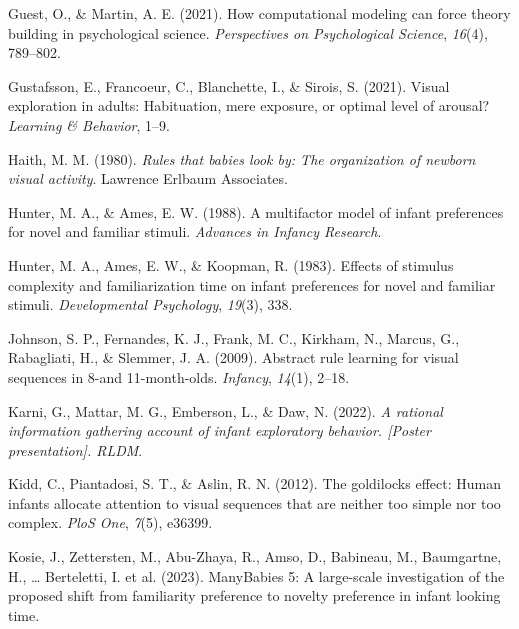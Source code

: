 \documentclass[10pt, letterpaper]{article}
\newenvironment{CSLReferences}%
  {}%
  {\par}
\begin{document}
\begin{CSLReferences}{1}{0}
\leavevmode{}%
Guest, O., \& Martin, A. E. (2021). How computational modeling can force
theory building in psychological science. \emph{Perspectives on
Psychological Science}, \emph{16}(4), 789--802.

\leavevmode{}%
Gustafsson, E., Francoeur, C., Blanchette, I., \& Sirois, S. (2021).
Visual exploration in adults: Habituation, mere exposure, or optimal
level of arousal? \emph{Learning \& Behavior}, 1--9.

\leavevmode{}%
Haith, M. M. (1980). \emph{Rules that babies look by: The organization
of newborn visual activity}. Lawrence Erlbaum Associates.

\leavevmode{}%
Hunter, M. A., \& Ames, E. W. (1988). A multifactor model of infant
preferences for novel and familiar stimuli. \emph{Advances in Infancy
Research}.

\leavevmode{}%
Hunter, M. A., Ames, E. W., \& Koopman, R. (1983). Effects of stimulus
complexity and familiarization time on infant preferences for novel and
familiar stimuli. \emph{Developmental Psychology}, \emph{19}(3), 338.

\leavevmode{}%
Johnson, S. P., Fernandes, K. J., Frank, M. C., Kirkham, N., Marcus, G.,
Rabagliati, H., \& Slemmer, J. A. (2009). Abstract rule learning for
visual sequences in 8-and 11-month-olds. \emph{Infancy}, \emph{14}(1),
2--18.

\leavevmode{}%
Karni, G., Mattar, M. G., Emberson, L., \& Daw, N. (2022). \emph{A
rational information gathering account of infant exploratory behavior.
{[}Poster presentation{]}. RLDM}.

\leavevmode{}%
Kidd, C., Piantadosi, S. T., \& Aslin, R. N. (2012). The goldilocks
effect: Human infants allocate attention to visual sequences that are
neither too simple nor too complex. \emph{PloS One}, \emph{7}(5),
e36399.

\leavevmode{}%
Kosie, J., Zettersten, M., Abu-Zhaya, R., Amso, D., Babineau, M.,
Baumgartne, H., \ldots{} Berteletti, I. et al. (2023). ManyBabies 5: A
large-scale investigation of the proposed shift from familiarity
preference to novelty preference in infant looking time.


\end{CSLReferences}
\end{document}
